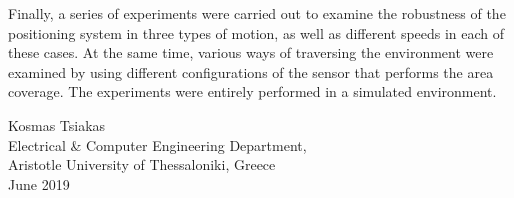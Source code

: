 {Finally, a series of experiments were carried out to examine the robustness of the positioning system in three types of motion, as well as different speeds in each of these cases. At the same time, various ways of traversing the environment were examined by using different configurations of the sensor that performs the area coverage. The experiments were entirely performed in a simulated environment.

\begin{flushright}
  \vspace{2cm}
  Kosmas Tsiakas
  \\
  Electrical \& Computer Engineering Department,
  \\
  Aristotle University of Thessaloniki, Greece
  \\
  June 2019
\end{flushright}

}
